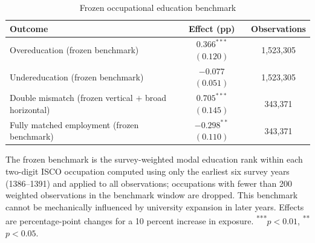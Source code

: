 \begin{table}[htbp]
  \centering
  \caption{Frozen occupational education benchmark}
  \label{tab:appfrozen}
  \begin{threeparttable}
  \begin{tabular}{L{7.0cm}cc}
    \toprule
    Outcome & Effect (pp) & Observations \\
    \midrule
    Overeducation (frozen benchmark)                       & $0.366^{***}$ $(0.120)$ & 1{,}523{,}305 \\
    Undereducation (frozen benchmark)                      & $-0.077$ $(0.051)$ & 1{,}523{,}305 \\
    Double mismatch (frozen vertical $+$ broad horizontal) & $0.705^{***}$ $(0.145)$ & 343{,}371 \\
    Fully matched employment (frozen benchmark)            & $-0.298^{**}$ $(0.110)$ & 343{,}371 \\
    \bottomrule
  \end{tabular}
  \begin{tablenotes}[flushleft]
    \footnotesize
    \item The frozen benchmark is the survey-weighted modal education rank within each two-digit
    ISCO occupation computed using only the earliest six survey years (1386--1391) and applied to
    all observations; occupations with fewer than 200 weighted observations in the benchmark
    window are dropped. This benchmark cannot be mechanically influenced by university expansion
    in later years. Effects are percentage-point changes for a 10 percent increase in exposure.
    \textsuperscript{***}$p<0.01$, \textsuperscript{**}$p<0.05$.
  \end{tablenotes}
  \end{threeparttable}
\end{table}

